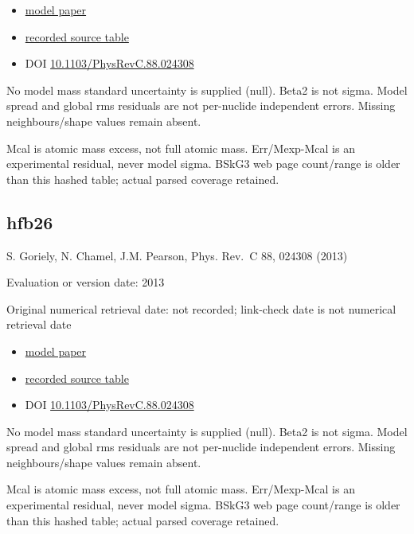 \documentclass[
  11pt,
  letterpaper,
]{article}
\providecommand{\tightlist}{%
  \setlength{\itemsep}{0pt}\setlength{\parskip}{0pt}}
\begin{document}
\begin{itemize}
\tightlist
\item
  \href{https://doi.org/10.1103/PhysRevC.88.024308}{model paper}
\item
  \href{https://www.astro.ulb.ac.be/bruslib/nucdata/hfb25-dat}{recorded
  source table}
\item
  DOI
  \href{https://doi.org/10.1103/PhysRevC.88.024308}{10.1103/PhysRevC.88.024308}
\end{itemize}

No model mass standard uncertainty is supplied (null). Beta2 is not
sigma. Model spread and global rms residuals are not per-nuclide
independent errors. Missing neighbours/shape values remain absent.

Mcal is atomic mass excess, not full atomic mass. Err/Mexp-Mcal is an
experimental residual, never model sigma. BSkG3 web page count/range is
older than this hashed table; actual parsed coverage retained.

\subsection{hfb26}\label{hfb26}

S. Goriely, N. Chamel, J.M. Pearson, Phys. Rev.~C 88, 024308 (2013)

Evaluation or version date: 2013

Original numerical retrieval date: not recorded; link-check date is not
numerical retrieval date

\begin{itemize}
\tightlist
\item
  \href{https://doi.org/10.1103/PhysRevC.88.024308}{model paper}
\item
  \href{https://www.astro.ulb.ac.be/bruslib/nucdata/hfb26-dat}{recorded
  source table}
\item
  DOI
  \href{https://doi.org/10.1103/PhysRevC.88.024308}{10.1103/PhysRevC.88.024308}
\end{itemize}

No model mass standard uncertainty is supplied (null). Beta2 is not
sigma. Model spread and global rms residuals are not per-nuclide
independent errors. Missing neighbours/shape values remain absent.

Mcal is atomic mass excess, not full atomic mass. Err/Mexp-Mcal is an
experimental residual, never model sigma. BSkG3 web page count/range is
older than this hashed table; actual parsed coverage retained.
\end{document}
